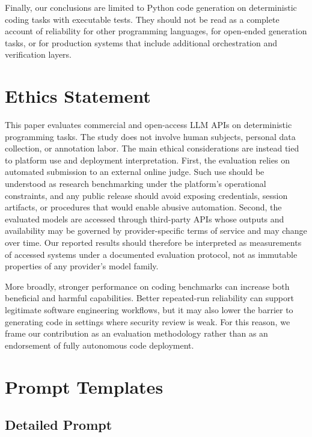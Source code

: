 \documentclass[11pt,a4paper]{article}
\begin{document}
Finally, our conclusions are limited to Python code generation on deterministic coding tasks with executable tests. They should not be read as a complete account of reliability for other programming languages, for open-ended generation tasks, or for production systems that include additional orchestration and verification layers.

\section*{Ethics Statement}

This paper evaluates commercial and open-access LLM APIs on deterministic programming tasks. The study does not involve human subjects, personal data collection, or annotation labor. The main ethical considerations are instead tied to platform use and deployment interpretation. First, the evaluation relies on automated submission to an external online judge. Such use should be understood as research benchmarking under the platform's operational constraints, and any public release should avoid exposing credentials, session artifacts, or procedures that would enable abusive automation. Second, the evaluated models are accessed through third-party APIs whose outputs and availability may be governed by provider-specific terms of service and may change over time. Our reported results should therefore be interpreted as measurements of accessed systems under a documented evaluation protocol, not as immutable properties of any provider's model family.

More broadly, stronger performance on coding benchmarks can increase both beneficial and harmful capabilities. Better repeated-run reliability can support legitimate software engineering workflows, but it may also lower the barrier to generating code in settings where security review is weak. For this reason, we frame our contribution as an evaluation methodology rather than as an endorsement of fully autonomous code deployment.



\appendix

\section{Prompt Templates}

\subsection{Detailed Prompt}
\end{document}
